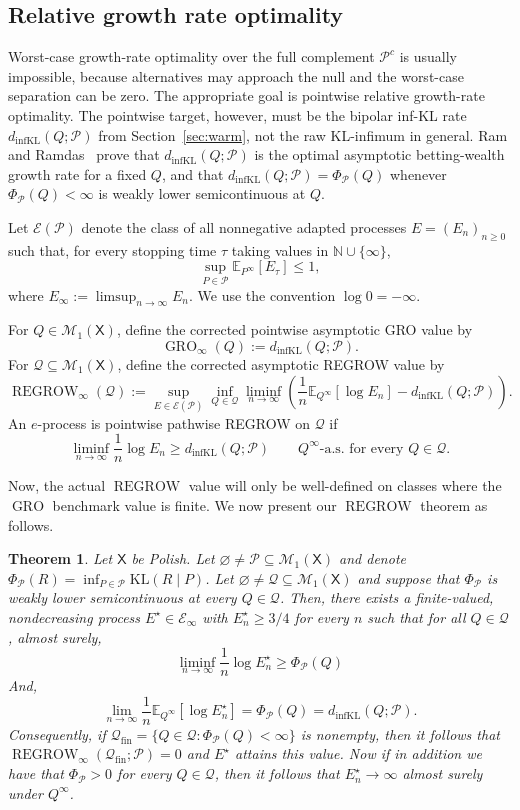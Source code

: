 \documentclass[11pt]{article}
\newcommand{\KL}{\mathrm{KL}}
\newcommand{\dinfKL}{d_{\mathrm{infKL}}}
\newcommand{\GRO}{\operatorname{GRO}}
\newcommand{\REGROW}{\operatorname{REGROW}}
\newcommand{\E}{\mathbb{E}}
\newcommand{\Pcal}{\mathcal{P}}
\newcommand{\Qcal}{\mathcal{Q}}
\newcommand{\X}{\mathsf{X}}
\newtheorem{theorem}{Theorem}[section]
\theoremstyle{definition}
\theoremstyle{definition}
\begin{document}
\subsection{Relative growth rate optimality}

Worst-case growth-rate optimality over the full complement $\Pcal^c$ is usually impossible, because alternatives may approach the null and the worst-case separation can be zero.  The appropriate goal is pointwise relative growth-rate optimality.  The pointwise target, however, must be the bipolar inf-KL rate $\dinfKL(Q;\Pcal)$ from Section~\ref{sec:warm}, not the raw KL-infimum in general.  Ram and Ramdas~\parencite{ramramdas2026optimalbettingwealth} prove that $\dinfKL(Q;\Pcal)$ is the optimal asymptotic betting-wealth growth rate for a fixed $Q$, and that $\dinfKL(Q;\Pcal)=\Phi_\Pcal(Q)$ whenever $\Phi_\Pcal(Q)<\infty$ is weakly lower semicontinuous at $Q$.

Let $\mathcal{E}(\Pcal)$ denote the class of all nonnegative adapted processes $E=(E_n)_{n\ge0}$ such that, for every stopping time $\tau$ taking values in $\mathbb N\cup\{\infty\}$,
\[
  \sup_{P\in\Pcal}\E_{P^\infty}[E_\tau]\le1,
\]
where $E_\infty:=\limsup_{n\to\infty}E_n$.  We use the convention $\log0=-\infty$.

For $Q\in\mathcal M_1(\X)$, define the corrected pointwise asymptotic GRO value by
\[
  \GRO_\infty(Q):=\dinfKL(Q;\Pcal).
\]
For $\Qcal\subseteq\mathcal M_1(\X)$, define the corrected asymptotic REGROW value by
\[
  \REGROW_\infty(\Qcal):=
  \sup_{E\in\mathcal{E}(\Pcal)}
  \inf_{Q\in\Qcal}
  \liminf_{n\to\infty}
  \left(
       \frac1n\E_{Q^\infty}[\log E_n]-\dinfKL(Q;\Pcal)
  \right).
\]
An $e$-process is pointwise pathwise REGROW on $\Qcal$ if
\[
  \liminf_{n\to\infty}\frac1n\log E_n
  \ge \dinfKL(Q;\Pcal)
  \qquad Q^\infty\text{-a.s. for every }Q\in\Qcal.
\]

Now, the actual $\REGROW$ value will only be well-defined on classes where the $\GRO$ benchmark value is finite. We now present our $\REGROW$ theorem as follows.



\begin{theorem}\label{regrow-localweaklsc}
Let $\X$ be Polish. Let $\varnothing\ne \Pcal\subseteq\mathcal M_1(\X)$ and denote $\Phi_{\Pcal}(R)=\inf_{P\in\Pcal}\KL(R\mid P)$. Let $\varnothing\ne \Qcal\subseteq \mathcal M_1(\X)$ and suppose that $\Phi_{\Pcal}$ is weakly lower semicontinuous at every $Q\in\Qcal$. Then, there exists a finite-valued, nondecreasing process $E^{\star}\in\mathcal E_{\infty}$ with $E_n^{\star}\ge 3/4$ for every $n$ such that for all $Q\in\Qcal$, almost surely,
\[
\liminf_{n\to\infty}\frac1n\log E_n^\star\ge \Phi_{\Pcal}(Q)
\]
And,
\[
\lim_{n\to\infty}\frac1n \E_{Q^{\infty}}[\log E_n^{\star}]=\Phi_{\Pcal}(Q)=\dinfKL(Q;\Pcal).
\]
Consequently, if $\Qcal_{\mathrm{fin}}=\{Q\in\Qcal:\Phi_{\Pcal}(Q)<\infty\}$ is nonempty, then it follows that $\REGROW_{\infty}(\Qcal_{\mathrm{fin}}; \Pcal)=0$ and $E^{\star}$ attains this value. Now if in addition we have that $\Phi_{\Pcal}>0$ for every $Q\in\Qcal$, then it follows that $E_n^{\star}\rightarrow \infty$ almost surely under $Q^{\infty}$. 
\end{theorem}
\end{document}
